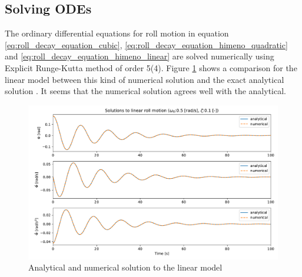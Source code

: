 \subsection{Solving ODEs}
\label{se:analytical_solution}
The ordinary differential equations for roll motion in equation \ref{eq:roll_decay_equation_cubic}, \ref{eq:roll_decay_equation_himeno_quadratic} and
\ref{eq:roll_decay_equation_himeno_linear} are solved numerically using Explicit Runge-Kutta method of order 5(4). Figure \ref{fig:analytical} shows a comparison for the linear model between this kind of numerical solution and the exact analytical solution \cite{henry_peter_piehl_ship_nodate}. It seems that the numerical solution agrees well with the analytical. 

\begin{figure}[h]
    \centering
    \includegraphics[width=\columnwidth]{figures/analytical.pdf}
    \caption{Analytical and numerical solution to the linear model}
    \label{fig:analytical}
\end{figure}